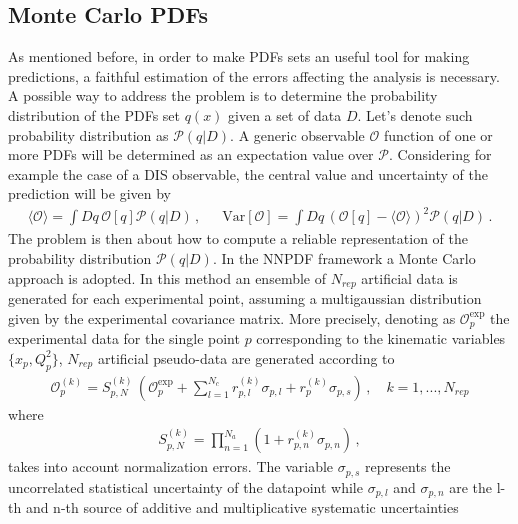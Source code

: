 \subsection{Monte Carlo PDFs}
As mentioned before, in order to make PDFs sets an useful tool for making predictions,
a faithful estimation of the errors affecting the analysis is necessary. A possible way
to address the problem is to determine the probability distribution of the PDFs set $q\left(x\right)$
given a set of data $D$. Let's denote such probability distribution as $\mathcal{P}\left(q|D\right)$.
A generic observable $\mathcal{O}$ function of one or more PDFs will be determined as an expectation value
over $\mathcal{P}$. Considering for example the case of a DIS observable, the central value and 
uncertainty of the prediction will be given by 
\begin{align}
    \label{eq:expectation_value_observable}
    \langle \mathcal{O}\rangle = \int Dq\, \mathcal{O}\left[q\right] \mathcal{P}\left(q|D\right)\,,\,\,\,\,\,\,\,\,\,
    \text{Var}\left[\mathcal{O}\right] = 
    \int Dq\, \left(\mathcal{O}\left[q\right] - \langle\mathcal{O}\rangle\right)^2
    \mathcal{P}\left(q|D\right)\,.
\end{align}
The problem is then about how to compute a reliable representation of the probability distribution
$\mathcal{P}\left(q|D\right)$.
In the NNPDF framework a Monte Carlo approach is adopted. In this method an ensemble of $N_{rep}$ artificial data is generated
for each experimental point, assuming a multigaussian distribution given by the experimental
covariance matrix. 
More precisely, denoting as $\mathcal{O}^{\text{exp}}_p$ the experimental data for the single point $p$ 
corresponding to the kinematic variables $\{x_p,Q_p^2\}$, 
$N_{rep}$ artificial pseudo-data are generated according to~\cite{Ball:2008by}
\begin{align}
    \mathcal{O}^{(k)}_p = 
    S_{p,N}^{(k)}\,\left(\mathcal{O}^{\text{exp}}_p+\sum_{l=1}^{N_c}r_{p,l}^{(k)}\sigma_{p,l} + r_{p}^{(k)}\sigma_{p, s} \right)\,,
    \,\,\,\,\,\,k = 1,..., N_{rep}
\end{align} 
where
\begin{align}
    S_{p,N}^{(k)} = \prod_{n=1}^{N_a}\left(1 + r_{p,n}^{(k)}\sigma_{p,n}\right)\,,
\end{align}
takes into account normalization errors. 
The variable $\sigma_{p, s}$ represents the uncorrelated statistical uncertainty of the datapoint while 
$\sigma_{p, l}$ and $\sigma_{p, n}$ are the l-th and n-th source of additive and multiplicative systematic uncertainties
